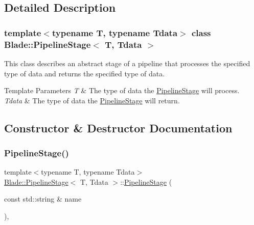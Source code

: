 \subsection{Detailed Description}
\subsubsection*{template$<$typename T, typename Tdata$>$\newline
class Blade\+::\+Pipeline\+Stage$<$ T, Tdata $>$}

This class describes an abstract stage of a pipeline that processes the specified type of data and returns the specified type of data. 


\begin{DoxyTemplParams}{Template Parameters}
{\em T} & The type of data the \hyperlink{class_blade_1_1_pipeline_stage}{Pipeline\+Stage} will process. \\
\hline
{\em Tdata} & The type of data the \hyperlink{class_blade_1_1_pipeline_stage}{Pipeline\+Stage} will return. \\
\hline
\end{DoxyTemplParams}


\subsection{Constructor \& Destructor Documentation}
\mbox{\label{class_blade_1_1_pipeline_stage_acc9f2dc27495c661bd4d985f9b7ab764}} 
\subsubsection{\texorpdfstring{Pipeline\+Stage()}{PipelineStage()}}
{\footnotesize\ttfamily template$<$typename T, typename Tdata$>$ \\
\hyperlink{class_blade_1_1_pipeline_stage}{Blade\+::\+Pipeline\+Stage}$<$ T, Tdata $>$\+::\hyperlink{class_blade_1_1_pipeline_stage}{Pipeline\+Stage} (\begin{DoxyParamCaption}\item[{const std\+::string \&}]{name }\end{DoxyParamCaption})\hspace{0.3cm}{\ttfamily [inline]}, {\ttfamily [explicit]}}



